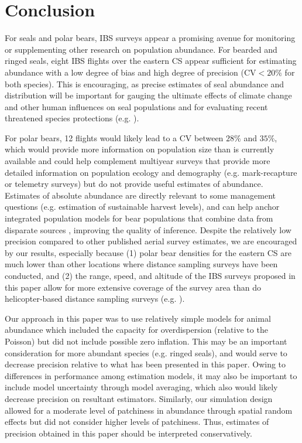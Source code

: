 \documentclass[]{rsos}%
\begin{document}
\section{Conclusion}

For seals and polar bears, IBS surveys appear a promising avenue for monitoring or supplementing other research on population abundance.  For bearded and ringed seals, eight IBS flights over the eastern CS appear sufficient for estimating abundance with a low degree of bias and high degree of precision ($\textrm{CV} < 20\%$ for both species).  This is encouraging, as precise estimates of seal abundance and distribution will be important for gauging the ultimate effects of climate change and other human influences on seal populations and for evaluating recent threatened species protections (e.g. \cite{NOAA2012}).

For polar bears, 12 flights would likely lead to a CV between $28\%$ and $35\%$, which would provide more information on population size than is currently available and could help complement multiyear surveys that provide more detailed information on population ecology and demography (e.g. mark-recapture or telemetry surveys) but do not provide useful estimates of abundance.  Estimates of absolute abundance are directly relevant to some management questions (e.g. estimation of sustainable harvest levels), and can help anchor integrated population models for bear populations that combine data from disparate sources \cite{FiebergEtAl2010}, improving the quality of inference.  Despite the relatively low precision compared to other published aerial survey estimates, we are encouraged by our results, especially because (1) polar bear densities for the eastern CS are much lower than other locations where distance sampling surveys have been conducted, and (2) the range, speed, and altitude of the IBS surveys proposed in this paper allow for more extensive coverage of the survey area than do helicopter-based distance sampling surveys (e.g. \cite{AarsEtAl2009,StapletonEtAl2014}).

Our approach in this paper was to use relatively simple models for animal abundance which included the capacity for overdispersion (relative to the Poisson) but did not include possible zero inflation.  This may be an important consideration for more abundant species (e.g. ringed seals), and would serve to decrease precision relative to what has been presented in this paper.  Owing to differences in performance among estimation models, it may also be important to include model uncertainty through model averaging, which also would likely decrease precision on resultant estimators. Similarly, our simulation design allowed for a moderate level of patchiness in abundance through spatial random effects but did not consider higher levels of patchiness. Thus, estimates of precision obtained in this paper should be interpreted conservatively.
\end{document}
